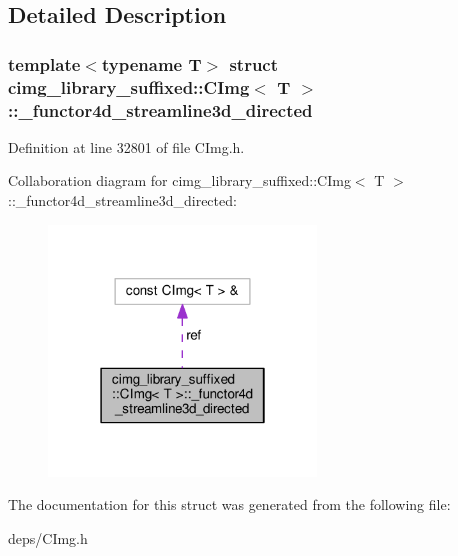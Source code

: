\subsection{Detailed Description}
\subsubsection*{template$<$typename T$>$\newline
struct cimg\+\_\+library\+\_\+suffixed\+::\+C\+Img$<$ T $>$\+::\+\_\+functor4d\+\_\+streamline3d\+\_\+directed}



Definition at line 32801 of file C\+Img.\+h.



Collaboration diagram for cimg\+\_\+library\+\_\+suffixed\+:\+:C\+Img$<$ T $>$\+:\+:\+\_\+functor4d\+\_\+streamline3d\+\_\+directed\+:
\nopagebreak
\begin{figure}[H]
\begin{center}
\leavevmode
\includegraphics[width=202pt]{d5/ddf/structcimg__library__suffixed_1_1CImg_1_1__functor4d__streamline3d__directed__coll__graph}
\end{center}
\end{figure}


The documentation for this struct was generated from the following file\+:\begin{DoxyCompactItemize}
\item 
deps/C\+Img.\+h\end{DoxyCompactItemize}
